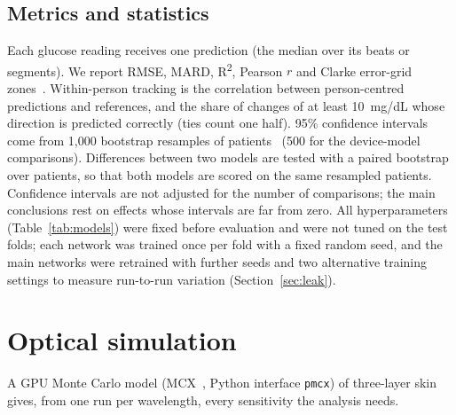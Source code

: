 \documentclass[11pt]{article}
\newcommand{\RR}{R\textsuperscript{2}}
\newcommand{\mgdl}{mg/dL}
\begin{document}
\subsection{Metrics and statistics}
Each glucose reading receives one prediction (the median over its beats or segments). We report RMSE, MARD, \RR{}, Pearson $r$ and Clarke error-grid zones~\citep{clarke1987}. Within-person tracking is the correlation between person-centred predictions and references, and the share of changes of at least 10~\mgdl{} whose direction is predicted correctly (ties count one half). 95\% confidence intervals come from 1,000 bootstrap resamples of patients~\citep{efron1993} (500 for the device-model comparisons). Differences between two models are tested with a paired bootstrap over patients, so that both models are scored on the same resampled patients. Confidence intervals are not adjusted for the number of comparisons; the main conclusions rest on effects whose intervals are far from zero. All hyperparameters (Table~\ref{tab:models}) were fixed before evaluation and were not tuned on the test folds; each network was trained once per fold with a fixed random seed, and the main networks were retrained with further seeds and two alternative training settings to measure run-to-run variation (Section~\ref{sec:leak}).

\FloatBarrier
\section{Optical simulation}
\label{sec:simmethods}
A GPU Monte Carlo model (MCX~\citep{fang2009}, Python interface \texttt{pmcx}) of three-layer skin gives, from one run per wavelength, every sensitivity the analysis needs.
\end{document}
